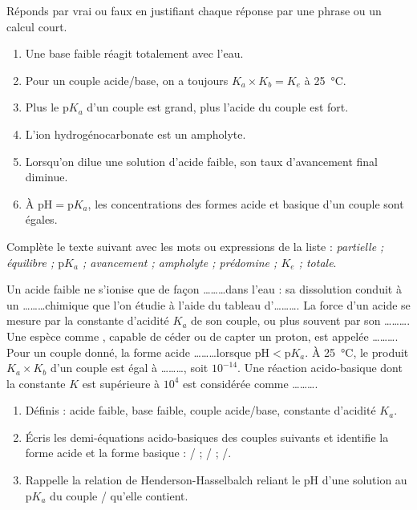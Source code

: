 \documentclass[11pt]{article}
\begin{document}
\begin{exercice}
Réponds par vrai ou faux en justifiant chaque réponse par une phrase ou un calcul court.
\begin{enumerate}
\item Une base faible réagit totalement avec l'eau.
\item Pour un couple acide/base, on a toujours $K_a \times K_b = K_e$ à \SI{25}{\celsius}.
\item Plus le $\mathrm{p}K_a$ d'un couple est grand, plus l'acide du couple est fort.
\item L'ion hydrogénocarbonate  est un ampholyte.
\item Lorsqu'on dilue une solution d'acide faible, son taux d'avancement final diminue.
\item À $\mathrm{pH} = \mathrm{p}K_a$, les concentrations des formes acide et basique d'un couple sont égales.
\end{enumerate}
\end{exercice}

\begin{exercice}
Complète le texte suivant avec les mots ou expressions de la liste : \emph{partielle ; équilibre ; $\mathrm{p}K_a$ ; avancement ; ampholyte ; prédomine ; $K_e$ ; totale}.

Un acide faible ne s'ionise que de façon \ldots\ldots\ldots dans l'eau : sa dissolution conduit à un \ldots\ldots\ldots chimique que l'on étudie à l'aide du tableau d'\ldots\ldots\ldots. La force d'un acide se mesure par la constante d'acidité $K_a$ de son couple, ou plus souvent par son \ldots\ldots\ldots. Une espèce comme , capable de céder ou de capter un proton, est appelée \ldots\ldots\ldots. Pour un couple donné, la forme acide \ldots\ldots\ldots lorsque $\mathrm{pH} < \mathrm{p}K_a$. À \SI{25}{\celsius}, le produit $K_a \times K_b$ d'un couple est égal à \ldots\ldots\ldots, soit $10^{-14}$. Une réaction acido-basique dont la constante $K$ est supérieure à $10^{4}$ est considérée comme \ldots\ldots\ldots.
\end{exercice}

\begin{exercice}
\begin{enumerate}
\item Définis : acide faible, base faible, couple acide/base, constante d'acidité $K_a$.
\item Écris les demi-équations acido-basiques des couples suivants et identifie la forme acide et la forme basique : / ; / ; /.
\item Rappelle la relation de Henderson-Hasselbalch reliant le pH d'une solution au $\mathrm{p}K_a$ du couple / qu'elle contient.
\end{enumerate}
\end{exercice}
\end{document}
